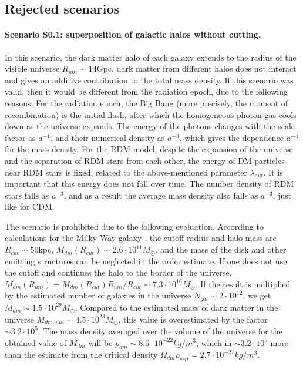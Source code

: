 \documentclass{article}
\begin{document}
\subsection{Rejected scenarios}

\paragraph {Scenario S0.1: superposition of galactic halos without cutting.} In this scenario, the dark matter halo of each galaxy extends to the radius of the visible universe $ R_ {uni} \sim14 $Gpc, dark matter from different halos does not interact and gives an additive contribution to the total mass density. If this scenario was valid, then it would be different from the radiation epoch, due to the following reasons. For the radiation epoch, the Big Bang (more precisely, the moment of recombination) is the initial flash, after which the homogeneous photon gas cools down as the universe expands. The energy of the photons changes with the scale factor as $ a ^ {- 1} $, and their numerical density as $ a ^ {- 3} $, which gives the dependence $ a ^ {- 4} $ for the mass density. For the RDM model, despite the expansion of the universe and the separation of RDM stars from each other, the energy of DM particles near RDM stars is fixed, related to the above-mentioned parameter $ \lambda_ {out} $. It is important that this energy does not fall over time. The number density of RDM stars falls as $ a ^ {- 3} $, and as a result the average mass density also falls as $ a ^ {- 3} $, just like for CDM.

The scenario is prohibited due to the following evaluation. According to calculations for the Milky Way galaxy \cite {bled2020}, the cutoff radius and halo mass are $ R_ {cut} \sim50 $kpc, $ M_ {dm} (R_ {cut}) \sim2.6 \cdot10 ^ {11} M_ \odot $, and the mass of the disk and other emitting structures can be neglected in the order estimate. If one does not use the cutoff and continues the halo to the border of the universe, $ M_ {dm} (R_ {uni}) = M_ {dm} (R_ {cut}) R_ {uni} / R_ {cut} \sim7.3 \cdot10 ^ { 16} M_ \odot $. If the result is multiplied by the estimated number of galaxies in the universe $ N_ {gal} \sim2 \cdot10 ^ {12} $, we get $ M_ {dm} \sim1.5 \cdot10 ^ {29} M_ \odot $. Compared to the estimated mass of dark matter in the universe $ M_ {dm, uni} \sim4.5 \cdot10 ^ {23} M_ \odot $, this value is overestimated by the factor $ \sim3.2 \cdot10 ^ 5 $. The mass density averaged over the volume of the universe for the obtained value of $ M_ {dm} $ will be $ \rho_ {dm} \sim8.6 \cdot10 ^ {- 22} kg / m ^ 3 $, which in $ \sim3.2 \cdot10 ^ 5 $ more than the estimate from the critical density $ \Omega_ {dm} \rho_ {crit} = 2.7 \cdot10 ^ {- 27} kg / m ^ 3 $.
\end{document}
